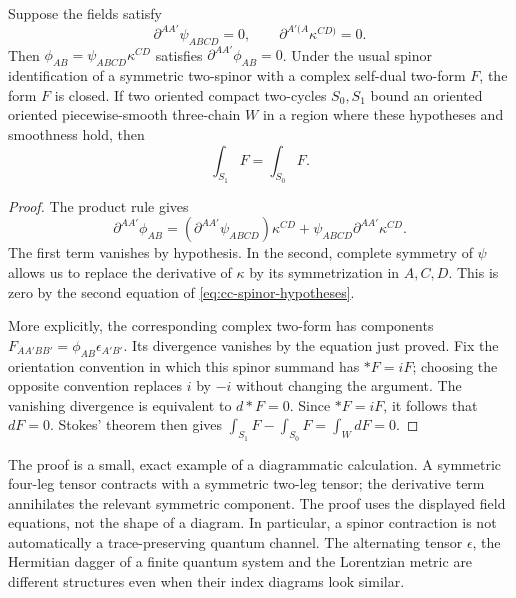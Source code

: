 \begin{proposition}
\label{prop:cc-spinor}
Suppose the fields satisfy
\begin{equation}
 \partial^{AA'}\psi_{ABCD}=0,
 \qquad \partial^{A'(A}\kappa^{CD)}=0.
 \label{eq:cc-spinor-hypotheses}
\end{equation}
Then $\phi_{AB}=\psi_{ABCD}\kappa^{CD}$ satisfies
$\partial^{AA'}\phi_{AB}=0$. Under the usual spinor identification of a
symmetric two-spinor with a complex self-dual two-form $F$, the form $F$
is closed. If two oriented compact two-cycles $S_0,S_1$ bound an oriented
oriented piecewise-smooth three-chain $W$ in a region where these hypotheses and smoothness hold,
then
\begin{equation}
 \int_{S_1}F=\int_{S_0}F.
 \label{eq:cc-charge}
\end{equation}
\end{proposition}

\begin{proof}
The product rule gives
\[
 \partial^{AA'}\phi_{AB}
 =(\partial^{AA'}\psi_{ABCD})\kappa^{CD}
 +\psi_{ABCD}\partial^{AA'}\kappa^{CD}.
\]
The first term vanishes by hypothesis. In the second, complete symmetry
of $\psi$ allows us to replace the derivative of $\kappa$ by its
symmetrization in $A,C,D$. This is zero by the second equation of
\eqref{eq:cc-spinor-hypotheses}.

More explicitly, the corresponding complex two-form has components
$F_{AA'BB'}=\phi_{AB}\epsilon_{A'B'}$. Its divergence vanishes by the
equation just proved. Fix the orientation convention in which this spinor
summand has $*F=iF$; choosing the opposite convention replaces $i$ by
$-i$ without changing the argument. The vanishing divergence is equivalent
to $d*F=0$. Since $*F=iF$, it follows that $dF=0$. Stokes' theorem then
gives $\int_{S_1}F-\int_{S_0}F=\int_WdF=0$.
\end{proof}

The proof is a small, exact example of a diagrammatic calculation. A
symmetric four-leg tensor contracts with a symmetric two-leg tensor;
the derivative term annihilates the relevant symmetric component. The
proof uses the displayed field equations, not the shape of a diagram.
In particular, a spinor contraction is not automatically a trace-preserving
quantum channel. The alternating tensor $\epsilon$, the Hermitian dagger
of a finite quantum system and the Lorentzian metric are different
structures even when their index diagrams look similar.

